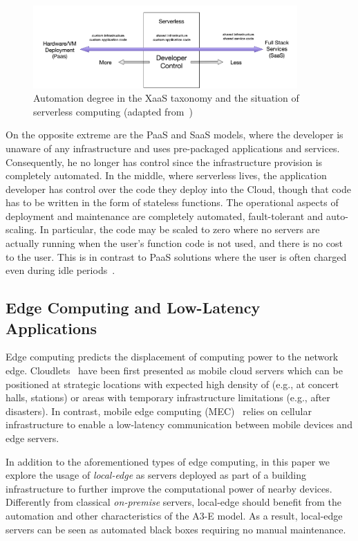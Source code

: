 \begin{figure}
	\includegraphics[width=0.9\textwidth]{figs/DeveloperControl.png}
	\caption{Automation degree in the XaaS taxonomy and the situation of serverless computing (adapted from~\cite{baldini2017serverless})}
	\label{fig:developer-control-serverless}
\end{figure}

On the opposite extreme are the PaaS and SaaS models, where the developer is unaware of any infrastructure and uses pre-packaged applications and services. Consequently, he no longer has control since the infrastructure provision is completely automated. In the middle, where serverless lives, the application developer has control over the code they deploy into the Cloud, though that code has to be written in the form of stateless functions.  The operational aspects of deployment and maintenance are completely automated, fault-tolerant and
auto-scaling. In particular, the code may be scaled to zero where no servers are actually running when the user's function code is not used, and there is no cost to the user. This is in contrast to PaaS solutions where the user is often charged even during idle periods~\cite{baldini2017serverless}.





\subsection{Edge Computing and Low-Latency Applications}

Edge computing predicts the displacement of computing power to the network edge. Cloudlets~\cite{CLOUDLETS} have been first presented as mobile cloud servers which can be positioned at strategic locations with expected high density of (e.g., at concert halls, stations) or areas with temporary infrastructure limitations (e.g., after disasters). In contrast, mobile edge computing (MEC)~\cite{MEC} relies on cellular infrastructure to enable a low-latency communication between mobile devices and edge servers. 

In addition to the aforementioned types of edge computing, in this paper we explore the usage of \textit{local-edge} as servers deployed as part of a building infrastructure to further improve the computational power of nearby devices. Differently from classical \textit{on-premise} servers, local-edge should benefit from the automation and other characteristics of the A3-E model. As a result, local-edge servers can be seen as automated black boxes requiring no manual maintenance.
